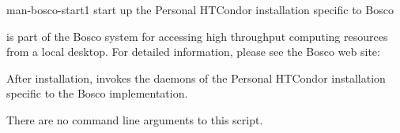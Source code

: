 \begin{ManPage}{}{man-bosco-start}{1}
{start up the Personal HTCondor installation specific to Bosco}


\Synopsis {}

\Description

 is part of the Bosco system for accessing high
throughput computing resources from a local desktop.
For detailed information, please see the Bosco web site:

After installation,  invokes the daemons of the
Personal HTCondor installation specific to the Bosco implementation.

There are no command line arguments to this script.


\end{ManPage}
